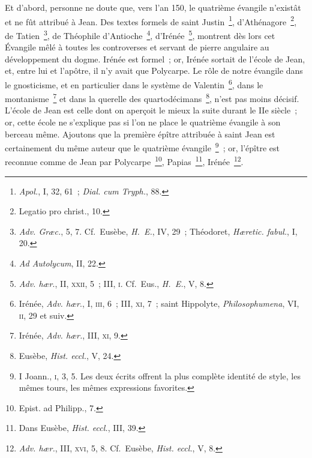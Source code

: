 \documentclass[french,twoside]{book} %
\begin{document}
Et d’abord, personne ne doute que, vers l’an 150, le quatrième évangile n’existât et ne fût attribué à Jean. Des textes formels de saint Justin \footnote{{\itshape Apol.}, I, 32, 61 ; {\itshape Dial. cum Tryph.}, 88.}, d’Athénagore \footnote{Legatio pro christ., 10.}, de Tatien \footnote{{\itshape Adv. Græc.}, 5, 7. Cf. Eusèbe, {\itshape H. E.}, IV, 29 ; Théodoret, {\itshape Hæretic. fabul.}, I, 20.}, de Théophile d’Antioche \footnote{{\itshape Ad Autolycum}, II, 22.}, d’Irénée \footnote{{\itshape Adv. hær}., II, \textsc{xxii}, 5 ; III, \textsc{i}. Cf. Eus., {\itshape H. E.}, V, 8.}, montrent dès lors cet Évangile mêlé à toutes les controverses et servant de pierre angulaire au développement du dogme. Irénée est formel ; or, Irénée sortait de l’école de Jean, et, entre lui et l’apôtre, il n’y avait que Polycarpe. Le rôle de notre évangile dans le gnosticisme, et en particulier dans le système de Valentin \footnote{ Irénée, {\itshape Adv. hær}., I, \textsc{iii}, 6 ; III, \textsc{xi}, 7 ; saint Hippolyte, {\itshape Philosophumena}, VI, \textsc{ii}, 29 et suiv.}, dans le montanisme \footnote{ Irénée, {\itshape Adv. hær.}, III, \textsc{xi}, 9.} et dans la querelle des quartodécimans \footnote{ Eusèbe, {\itshape Hist. eccl.}, V, 24.}, n’est pas moins décisif. L’école de Jean est celle dont on aperçoit le mieux la suite durant le IIe siècle ; or, cette école ne s’explique pas si l’on ne place le quatrième évangile à son berceau même. Ajoutons que la première épître attribuée à saint Jean est certainement du même auteur que le quatrième évangile \footnote{ I Joann., \textsc{i}, 3, 5. Les deux écrits offrent la plus complète identité de style, les mêmes tours, les mêmes expressions favorites.} ; or, l’épître est reconnue comme de Jean par Polycarpe \footnote{Epist. ad Philipp., 7.}, Papias \footnote{ Dans Eusèbe, {\itshape Hist. eccl.}, III, 39.}, Irénée \footnote{{\itshape Adv. hær.}, III, \textsc{xvi}, 5, 8. Cf. Eusèbe, {\itshape Hist. eccl.}, V, 8.}.\par
\end{document}
